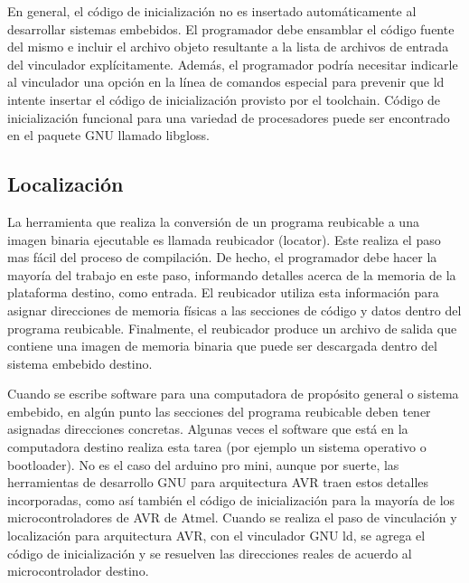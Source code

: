 \documentclass[12pt]{article}
\begin{document}
En general, el código de inicialización no es insertado automáticamente al desarrollar sistemas embebidos. El
programador debe ensamblar el código fuente del mismo e incluir el archivo objeto resultante a la 
lista de archivos de entrada del vinculador explícitamente. Además, el programador
podría necesitar indicarle al vinculador una opción en la línea de comandos especial
para prevenir que ld intente insertar el código de inicialización provisto
por el toolchain.
Código de inicialización funcional para una variedad de procesadores puede
ser encontrado en el paquete GNU llamado libgloss.



\subsection *{Localización}

La herramienta que realiza la conversión de un programa reubicable a
una imagen binaria ejecutable es llamada reubicador (locator).
Este realiza el paso mas fácil del proceso de compilación. De hecho, 
el programador debe hacer la mayoría del trabajo en este paso, informando
detalles acerca de la memoria de la plataforma destino, como entrada.
El reubicador utiliza esta información para asignar direcciones
de memoria físicas a las secciones de código y datos dentro del programa
reubicable. Finalmente, el reubicador produce un archivo de salida que contiene
una imagen de memoria binaria que puede ser descargada dentro del sistema
embebido destino.

Cuando se escribe software para una computadora de propósito general o
sistema embebido, en algún punto las secciones del programa reubicable
deben tener asignadas direcciones concretas. Algunas veces el software
que está en la computadora destino realiza esta tarea (por ejemplo un sistema
operativo o bootloader). No es el caso del arduino pro mini, aunque por suerte,
las herramientas de desarrollo GNU para arquitectura AVR traen estos detalles 
incorporadas, como así también el código de inicialización para la mayoría
de los microcontroladores de AVR de Atmel.
Cuando se realiza el paso de vinculación y localización para arquitectura AVR,
con el vinculador GNU ld, se agrega el código de inicialización y se 
resuelven las direcciones reales de acuerdo al microcontrolador destino.
\end{document}
